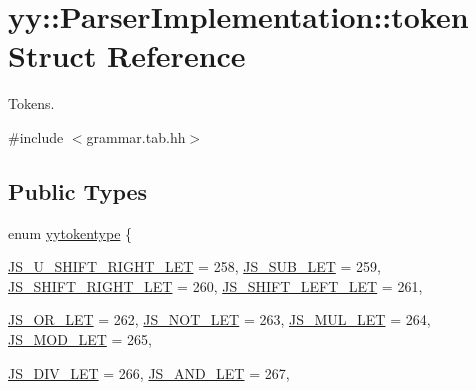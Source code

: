 \hypertarget{structyy_1_1_parser_implementation_1_1token}{
\section{yy::ParserImplementation::token Struct Reference}
\label{structyy_1_1_parser_implementation_1_1token}
}


Tokens.  




{\ttfamily \#include $<$grammar.tab.hh$>$}

\subsection*{Public Types}
\begin{DoxyCompactItemize}
\item 
enum \hyperlink{structyy_1_1_parser_implementation_1_1token_aadf9ae7281b1272b27ee431a11ede892}{yytokentype} \{ \par
\hyperlink{structyy_1_1_parser_implementation_1_1token_aadf9ae7281b1272b27ee431a11ede892a8db2c35a564afdf019ed64b510086260}{JS\_\-U\_\-SHIFT\_\-RIGHT\_\-LET} =  258, 
\hyperlink{structyy_1_1_parser_implementation_1_1token_aadf9ae7281b1272b27ee431a11ede892af6c47a514281cc138e0dcd9ee32a8413}{JS\_\-SUB\_\-LET} =  259, 
\hyperlink{structyy_1_1_parser_implementation_1_1token_aadf9ae7281b1272b27ee431a11ede892a78c4ade27539158a421ae079e98e8533}{JS\_\-SHIFT\_\-RIGHT\_\-LET} =  260, 
\hyperlink{structyy_1_1_parser_implementation_1_1token_aadf9ae7281b1272b27ee431a11ede892a7a69be9ea86bc5dba6ed71c61792b78d}{JS\_\-SHIFT\_\-LEFT\_\-LET} =  261, 
\par
\hyperlink{structyy_1_1_parser_implementation_1_1token_aadf9ae7281b1272b27ee431a11ede892ae8b83bab312314a01fda11d79107d0ec}{JS\_\-OR\_\-LET} =  262, 
\hyperlink{structyy_1_1_parser_implementation_1_1token_aadf9ae7281b1272b27ee431a11ede892afed37f0bf1e6baa423eb06fd27d928d2}{JS\_\-NOT\_\-LET} =  263, 
\hyperlink{structyy_1_1_parser_implementation_1_1token_aadf9ae7281b1272b27ee431a11ede892a4f149daefb984240aad738998c42e7a8}{JS\_\-MUL\_\-LET} =  264, 
\hyperlink{structyy_1_1_parser_implementation_1_1token_aadf9ae7281b1272b27ee431a11ede892a9dfdea539660219b1e34320d291f3e26}{JS\_\-MOD\_\-LET} =  265, 
\par
\hyperlink{structyy_1_1_parser_implementation_1_1token_aadf9ae7281b1272b27ee431a11ede892a791ee5c52992bcdc1c9e18582384784c}{JS\_\-DIV\_\-LET} =  266, 
\hyperlink{structyy_1_1_parser_implementation_1_1token_aadf9ae7281b1272b27ee431a11ede892a9a58cab542c64c15145f2349c63f8a1a}{JS\_\-AND\_\-LET} =  267, 

\end{DoxyCompactItemize}
